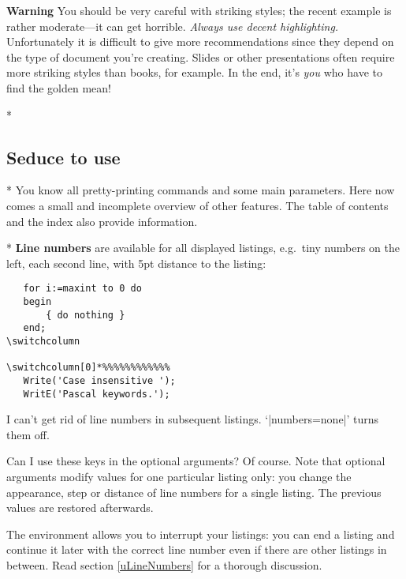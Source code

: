 \begin{paracol}{2}
\textbf{Warning}\label{wStrikingStyles}
You should be very careful with striking styles; the recent example is rather
moderate---it can get horrible. \emph{Always use decent highlighting.}
Unfortunately it is difficult to give more recommendations since they depend
on the type of document you're creating. Slides or other presentations often
require more striking styles than books, for example.
In the end, it's \emph{you} who have to find the golden mean!
\switchcolumn

\switchcolumn[0]*%
\subsection{Seduce to use}\label{gSeduceToUse}
\switchcolumn

\switchcolumn[0]*%
You know all pretty-printing commands and some main parameters. Here now
comes a small and incomplete overview of other features. The table of
contents and the index also provide information.
\switchcolumn

\switchcolumn[0]*%
\textbf{Line numbers}
are available for all displayed listings, e.g.~tiny numbers on the left, each
second line, with 5pt distance to the listing:
\begin{lstxsample}
   \lstset{numbers=left, numberstyle=\tiny, stepnumber=2, numbersep=5pt}
\end{lstxsample}
\begin{lstsample}{}{}
   \begin{lstlisting}
   for i:=maxint to 0 do
   begin
       { do nothing }
   end;
\switchcolumn

\switchcolumn[0]*%%%%%%%%%%%%
   Write('Case insensitive ');
   WritE('Pascal keywords.');
   \end{lstlisting}
\end{lstsample}
\begin{advise}
\item I can't get rid of line numbers in subsequent listings.
      \advisespace
      `|numbers=none|' turns them off.
\item Can I use these keys in the optional arguments?
      \advisespace
      Of course. Note that optional arguments modify values for one
      particular listing only: you change the appearance, step or distance
      of line numbers for a single listing. The previous values are
      restored afterwards.
\end{advise}
The environment allows you to interrupt your listings: you can end a listing
and continue it later with the correct line number even if there are other
listings in between. Read section \ref{uLineNumbers} for a thorough
discussion.
\switchcolumn


\end{paracol}
